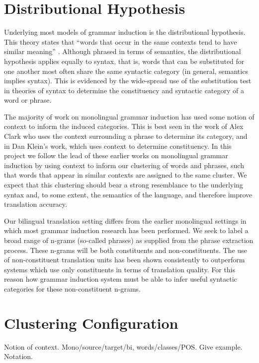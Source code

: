 \section{Distributional Hypothesis}

Underlying most models of grammar induction is the distributional hypothesis. This theory states that
``words that occur in the same contexts tend to have similar meaning'' \cite{harris:54}. Although phrased in terms of semantics, the distributional hypothesis applies equally to syntax, that is, words that can be substituted for one another most often share the same syntactic category (in general, semantics implies syntax). This is evidenced by the wide-spread use of the substitution test in theories of syntax to determine the constituency and syntactic category of a word or phrase.

The majority of work on monolingual grammar induction has used some notion of context to inform the induced categories. This is best seen in the work of Alex Clark who uses the context surrounding a phrase to determine its category, and in Dan Klein's work, which uses context to determine constituency. In this project we follow the lead of these earlier works on monolingual grammar induction by using context to inform our clustering of words and phrases, such that words that appear in similar contexts are assigned to the same cluster. We expect that this clustering should bear a strong resemblance to the underlying syntax and, to some extent, the semantics of the language, and therefore improve translation accuracy.

Our bilingual translation setting differs from the earlier monolingual settings in which most grammar induction research has been performed. We seek to label a broad range of n-grams (so-called phrases) as supplied from the phrase extraction process. These n-grams will be both constituents and non-constituents. The use of non-constituent translation units has been shown consistently to outperform systems which use only constituents in terms of translation quality. For this reason how grammar induction system must be able to infer useful syntactic categories for these non-constituent n-grams.

\section{Clustering Configuration}

Notion of context.
Mono/source/target/bi, words/classes/POS.
Give example.
Notation.

